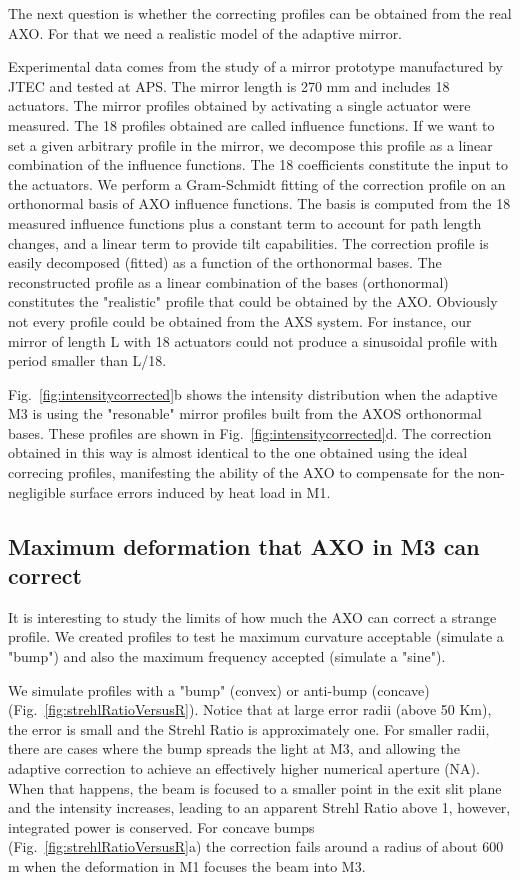 \documentclass[]{spie}  %
\begin{document}
The next question is whether the correcting profiles can be obtained from the real AXO. For that we need a realistic model of the adaptive mirror.

Experimental data comes from the study of a mirror prototype manufactured by JTEC and tested at APS. The mirror length is 270 mm and includes 18 actuators. The mirror profiles obtained by activating a single actuator were measured. The 18 profiles obtained are called influence functions. If we want to set a given arbitrary  profile in the mirror, we decompose this profile as a linear combination of the influence functions. The 18 coefficients constitute the input to the actuators.  
We perform a Gram-Schmidt fitting of the correction profile on an orthonormal basis of AXO influence functions. The basis is computed from the 18 measured influence functions plus a constant term to account for path length changes, and a linear term to provide tilt capabilities. The correction profile is easily decomposed (fitted) as a function of the orthonormal bases. The reconstructed profile as a linear combination of the bases (orthonormal) constitutes the "realistic" profile that could be obtained by the AXO. Obviously not every profile could be obtained from the AXS system. For instance, our mirror of length L with 18 actuators could not produce a sinusoidal profile with period smaller than L/18. 

Fig.~\ref{fig:intensitycorrected}b shows the intensity distribution when the adaptive M3 is using the "resonable" mirror profiles built from the AXOS orthonormal bases. These profiles are shown in Fig.~\ref{fig:intensitycorrected}d. The correction obtained in this way is almost identical to the one obtained using the ideal correcing profiles, manifesting the ability of the AXO to compensate for the non-negligible surface errors induced by heat load in M1.  


\subsection{Maximum deformation that AXO in M3 can correct}

It is interesting to study the limits of how much the AXO can correct a strange profile. We created profiles to test he maximum curvature acceptable (simulate a "bump") and also the maximum frequency accepted (simulate a "sine"). 

We simulate profiles with a "bump" (convex) or anti-bump (concave) (Fig.~\ref{fig:strehlRatioVersusR}). Notice that at large error radii (above 50 Km), the error is small and the Strehl Ratio is approximately one. For smaller radii, there are cases where the bump spreads the light at M3, and allowing the adaptive correction to achieve an effectively higher numerical aperture (NA). When that happens, the beam is focused to a smaller point in the exit slit plane and the intensity increases, leading to an apparent Strehl Ratio above 1, however, integrated power is conserved.
For concave bumps (Fig.~\ref{fig:strehlRatioVersusR}a) the correction fails around a radius of about 600 m when the deformation in M1 focuses the beam into M3.
\end{document}
